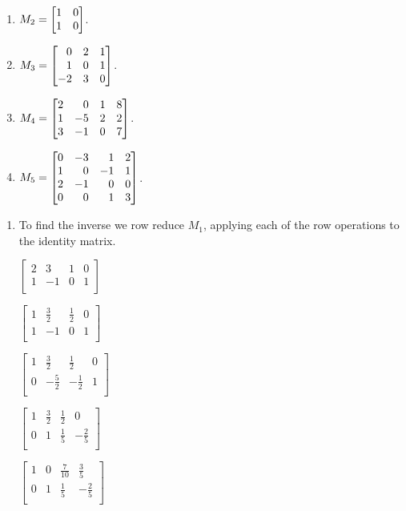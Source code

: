 \begin{exercises}
\begin{problist}
\begin{enumerate}
			\item $M_{2} = \mat{1&0\\1&0}$.

			\item $M_{3} = \mat{0&2&1\\1&0&1\\-2&3&0}$.

			\item $M_{4} = \mat{2&0&1&8\\1&-5&2&2\\3&-1&0&7}$.

			\item $M_{5} = \mat{0&-3&1&2\\1&0&-1&1\\2&-1&0&0\\0&0&1&3}$.
		\end{enumerate}

		\begin{solution}
	    \begin{enumerate}
				\item
				To find the inverse we row reduce $M_{1}$, applying each
				of the row operations to the identity matrix.

				$\left[\begin{array}{cc|cc}
							2&3&1&0\\
							1&-1&0&1\\
							\end{array}\right]$

				$\left[\begin{array}{cc|cc}
							1&\frac{3}{2}&\frac{1}{2}&0\\
							1&-1&0&1\\
							\end{array}\right]$

				$\left[\begin{array}{cc|cc}
							1&\frac{3}{2}&\frac{1}{2}&0\\
							0&-\frac{5}{2}&-\frac{1}{2}&1\\
							\end{array}\right]$

				$\left[\begin{array}{cc|cc}
							1&\frac{3}{2}&\frac{1}{2}&0\\
							0&1&\frac{1}{5}&-\frac{2}{5}\\
							\end{array}\right]$

				$\left[\begin{array}{cc|cc}
							1&0&\frac{7}{10}&\frac{3}{5}\\
							0&1&\frac{1}{5}&-\frac{2}{5}\\
							\end{array}\right]$


\end{enumerate}
\end{solution}
\end{problist}
\end{exercises}

